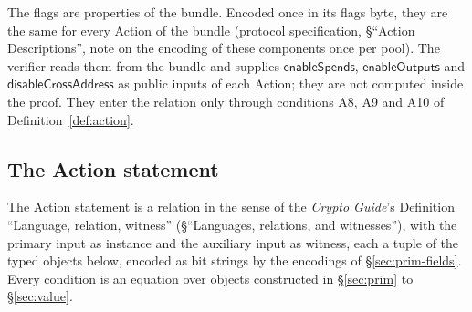 \documentclass[11pt,a4paper]{article}
\theoremstyle{definition}
\begin{document}
The flags are properties of the bundle. Encoded once in its flags byte, they
are the same for every Action of the bundle (protocol specification,
\S``Action Descriptions'', note on the encoding of these components once per
pool). The verifier reads them from the bundle and supplies
$\mathsf{enableSpends}$, $\mathsf{enableOutputs}$ and
$\mathsf{disableCrossAddress}$ as public inputs of each Action; they are not
computed inside the proof. They enter the relation only through conditions
A8, A9 and A10 of Definition~\ref{def:action}.

\FloatBarrier
\subsection{The Action statement}\label{sec:action-statement}

The Action statement is a relation in the sense of the \emph{Crypto Guide}'s
Definition ``Language, relation, witness'' (\S``Languages, relations, and
witnesses''), with the primary input as instance and the auxiliary input as
witness, each a tuple of the typed objects below, encoded as bit strings by
the encodings of \S\ref{sec:prim-fields}. Every condition is an equation over
objects constructed in \S\ref{sec:prim} to \S\ref{sec:value}.
\end{document}
